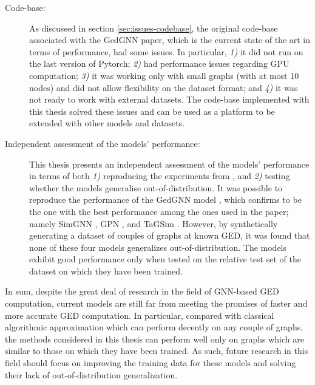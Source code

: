\documentclass[../Thesis.tex]{subfiles}
\begin{document}
\begin{description}
        \item[Code-base:] As discussed in section \ref{sec:issues-codebase}, the original code-base associated with the GedGNN paper\cite{computing_graph_edit_distance_via_neural_graph_matching}, which is the current state of the art in terms of performance, had some issues. In particular, \emph{1)} it did not run on the last version of Pytorch; \emph{2)} had performance issues regarding GPU computation; \emph{3)} it was working only with small graphs (with at most 10 nodes) and did not allow flexibility on the dataset format; and \emph{4)} it was not ready to work with external datasets. The code-base implemented with this thesis solved these issues and can be used as a platform to be extended with other models and datasets.

        \item[Independent assessment of the models' performance:] This thesis presents an independent assessment of the models' performance in terms of both \emph{1)} reproducing the experiments from \cite{computing_graph_edit_distance_via_neural_graph_matching}, and \emph{2)} testing whether the models generalise out-of-distribution. It was possible to reproduce the performance of the GedGNN model \cite{computing_graph_edit_distance_via_neural_graph_matching}, which confirms to be the one with the best performance among the ones used in the paper; namely SimGNN \cite{simgnn__a_neural_network_approach_to_fast_graph_similarity_computation}, GPN \cite{noah__neural_optimized_a*_search_algorithm_for_graph_edit_distance_computation}, and TaGSim \cite{TaGSim_type_aware_graph_similarity_learning_and_computation}. However, by synthetically generating a dataset of couples of graphs at known GED, it was found that none of these four models generalizes out-of-distribution. The models exhibit good performance only when tested on the relative test set of the dataset on which they have been trained.
    \end{description}

In sum, despite the great deal of research in the field of GNN-based GED computation, current models are still far from meeting the promises of faster and more accurate GED computation.
In particular, compared with classical algorithmic approximation which can perform decently on any couple of graphs, the methods considered in this thesis can perform well only on graphs which are similar to those on which they have been trained.
As such, future research in this field should focus on improving the training data for these models and solving their lack of out-of-distribution generalization.
\end{document}
